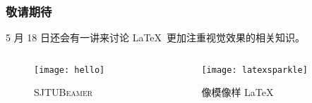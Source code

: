 \begin{frame}
  \frametitle{敬请期待}
  
  5 月 18 日还会有一讲来讨论 \LaTeX\ 更加注重视觉效果的相关知识。

  \begin{columns}
    \begin{column}{0.5\textwidth}
      \begin{figure}
        \begin{stampbox}[sjtuRedPrimary]
          \texttt{[image: hello]}
        \end{stampbox}
        \caption{\textsc{SJTUBeamer} }
      \end{figure}
    \end{column}
    \begin{column}{0.5\textwidth}
      \begin{figure}
        \begin{stampbox}[sjtuRedPrimary]
          \texttt{[image: latexsparkle]}
        \end{stampbox}
        \caption{像模像样 \LaTeX\ }
      \end{figure}
    \end{column}
  \end{columns}
\end{frame}